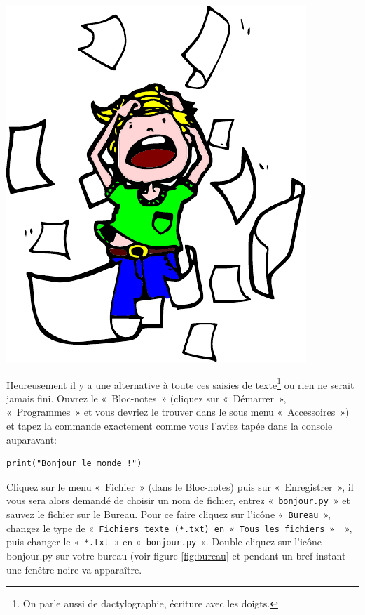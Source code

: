 \begin{center}
\includegraphics[scale=1]{images/encore.pdf} 
\end{center} 

Heureusement il y a une alternative à toute ces saisies de texte\footnote{On parle aussi de dactylographie, écriture avec les doigts.} ou rien ne serait jamais fini.
Ouvrez le « Bloc-notes » (cliquez sur « Démarrer », « Programmes » et vous devriez le trouver dans le sous menu « Accessoires ») et tapez la commande exactement comme vous l'aviez tapée dans la console auparavant:

\begin{Verbatim}[frame=single,rulecolor=\color{gray}, label=ne pas saisir]
print("Bonjour le monde !")
\end{Verbatim}
\rm

Cliquez sur le menu « Fichier » (dans le Bloc-notes) puis sur « Enregistrer », il vous sera alors demandé de choisir un nom de fichier, entrez « \texttt{bonjour.py} » et sauvez le fichier sur le Bureau. Pour ce faire cliquez sur l'icône « \texttt{Bureau} », changez le type de « \texttt{Fichiers texte (*.txt) en « \texttt{Tous les fichiers} » } », puis changer le « \texttt{*.txt} » en « \texttt{bonjour.py} ». Double cliquez sur l'icône bonjour.py sur votre bureau (voir figure \ref{fig:bureau} et pendant un bref instant une fenêtre noire va apparaître.


